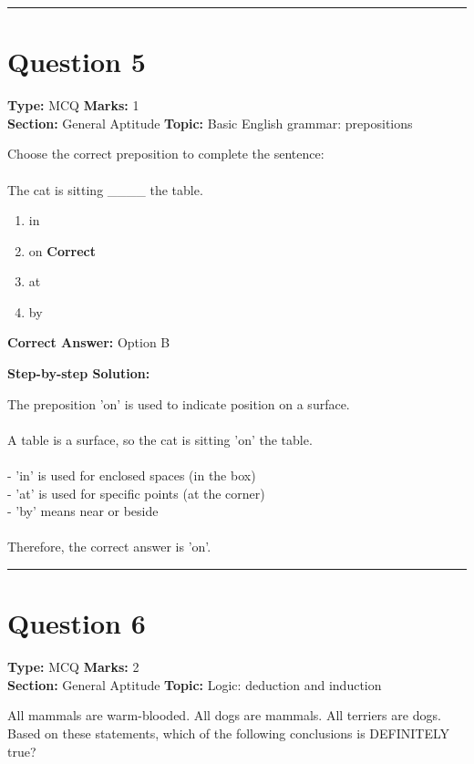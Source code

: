 \documentclass[11pt]{article}
\begin{document}
\vspace{0.8em}
\hrule
\vspace{0.4em}
\section*{Question 5}
\textbf{Type:} MCQ \hfill \textbf{Marks:} 1\\
\textbf{Section:} General Aptitude \hfill \textbf{Topic:} Basic English grammar: prepositions

Choose the correct preposition to complete the sentence:\\
\\
The cat is sitting \_\_\_\_ the table.


\begin{enumerate}[label=\textbf{\Alph*.}, leftmargin=1.8em]
\item in\item on \hfill {\color{gategreen}\textbf{Correct}}\item at\item by\end{enumerate}

\textbf{Correct Answer:} Option B

\textbf{Step-by-step Solution:}

The preposition 'on' is used to indicate position on a surface.\\
\\
 A table is a surface, so the cat is sitting 'on' the table.\\
\\
 - 'in' is used for enclosed spaces (in the box)\\
 - 'at' is used for specific points (at the corner)\\
 - 'by' means near or beside\\
\\
 Therefore, the correct answer is 'on'.

\vspace{0.8em}
\hrule
\vspace{0.4em}
\section*{Question 6}
\textbf{Type:} MCQ \hfill \textbf{Marks:} 2\\
\textbf{Section:} General Aptitude \hfill \textbf{Topic:} Logic: deduction and induction

All mammals are warm-blooded. All dogs are mammals. All terriers are dogs. Based on these statements, which of the following conclusions is DEFINITELY true?
\end{document}
